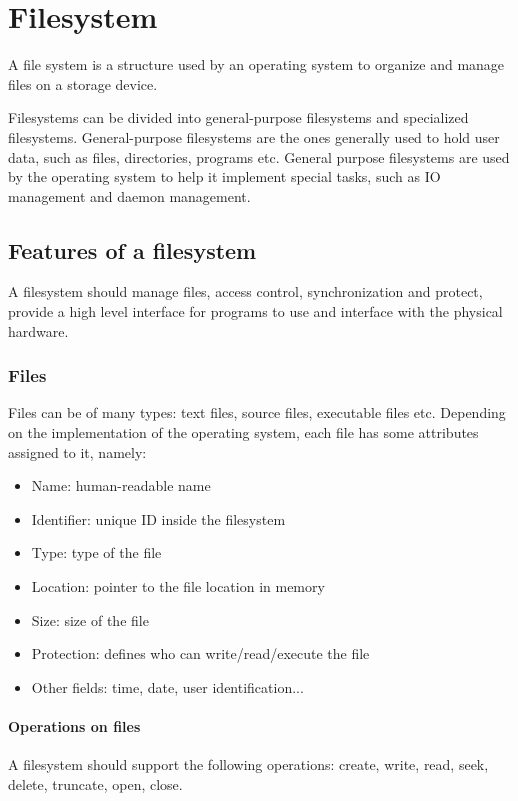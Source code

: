 \chapter{Filesystem}
A file system is a structure used by an operating system to organize and manage files on a storage device.

Filesystems can be divided into general-purpose filesystems and specialized filesystems. General-purpose filesystems are the ones generally used to hold user data, such as files, directories, programs etc. General purpose filesystems are used by the operating system to help it implement special tasks, such as IO management and daemon management.

\section{Features of a filesystem}
A filesystem should manage files, access control, synchronization and protect, provide a high level interface for programs to use and interface with the physical hardware.

\subsection{Files}
Files can be of many types: text files, source files, executable files etc. Depending on the implementation of the operating system, each file has some attributes assigned to it, namely:
\begin{itemize}
    \item Name: human-readable name
    \item Identifier: unique ID inside the filesystem
    \item Type: type of the file
    \item Location: pointer to the file location in memory
    \item Size: size of the file
    \item Protection: defines who can write/read/execute the file
    \item Other fields: time, date, user identification...
\end{itemize}

\subsubsection{Operations on files}
A filesystem should support the following operations: create, write, read, seek, delete, truncate, open, close.

